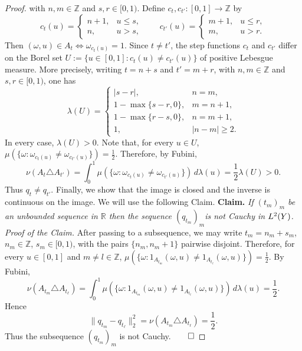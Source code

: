\documentclass[10pt,a4paper]{amsart}
\newcommand{\Z}{\mathbb{Z}}
\begin{document}
\begin{proof}
with \(n,m\in\mathbb Z\) and \(s,r\in[0,1)\). Define $c_t,c_{t'}:[0,1]\to\Z$ by
\[
        c_t(u)=
        \begin{cases}
        n+1, & u\leq s,\\
        n, & u>s,
        \end{cases}
        \qquad
        c_{t'}(u)=
        \begin{cases}
        m+1, & u\leq r,\\
        m, & u>r.
        \end{cases}
\]
Then $(\omega,u)\in A_t\Leftrightarrow\omega_{c_t(u)}=1$. Since \(t\neq t'\), the step functions \(c_t\) and \(c_{t'}\) differ on the Borel set $U:=\{u\in[0,1]:c_t(u)\neq c_{t'}(u)\}$
of positive Lebesgue measure. More precisely, writing
$t=n+s$ and $t'=m+r$, with $n,m\in\mathbb Z$ and $s,r\in[0,1)$, one has
$$
\lambda(U)=
\begin{cases}
|s-r|, & n=m,\\
1-\max\{s-r,0\}, & m=n+1,\\
1-\max\{r-s,0\}, & n=m+1,\\
1, & |n-m|\geq 2.
\end{cases}
$$
In every case, $\lambda(U)>0$. Note that, for every \(u\in U\), $ \mu(\{\omega:\omega_{c_t(u)}\neq\omega_{c_{t'}(u)}\})
        =
        \frac12$. Therefore, by Fubini,
\[
        \nu(A_t\triangle A_{t'})
        =
        \int_0^1
        \mu(\{\omega:\omega_{c_t(u)}\neq\omega_{c_{t'}(u)}\})\,d\lambda(u)
       =
        \frac12\lambda(U)>0.
\]
Thus \(q_t\neq q_{t'}\).
\medskip
\noindent Finally, we show that the image is closed and the inverse is continuous on the image. We will use the following Claim.
\medskip
\noindent\textbf{Claim.} \textit{If \((t_m)_m\) be an unbounded sequence in \(\mathbb R\) then the sequence $(q_{t_m})_m$is not Cauchy in \({\rm L}^2(Y)\).}
\medskip
\noindent\textit{Proof of the Claim.} After passing to a subsequence, we may write $t_m=n_m+s_m$, $n_m\in\mathbb Z$, $s_m\in[0,1)$, with the pairs $\{n_m,n_m+1\}$ pairwise disjoint. Therefore, for every \(u\in[0,1]\) and $m\neq l\in\Z$, $\mu(\{\omega:1_{A_{t_m}}(\omega,u)\neq 1_{A_{t_\ell}}(\omega,u)\})=\frac12$. By Fubini,
\[
        \nu(A_{t_m}\triangle A_{t_\ell})
        =
        \int_0^1
        \mu(\{\omega:1_{A_{t_m}}(\omega,u)\neq 1_{A_{t_\ell}}(\omega,u)\})
        \,d\lambda(u)
        =
        \frac12.
\]
Hence
\[
        \|q_{t_m}-q_{t_\ell}\|_2^2
        =
        \nu(A_{t_m}\triangle A_{t_\ell})
        =
        \frac12.
\]
Thus the subsequence \((q_{t_m})_m\) is not Cauchy.$\hfill\qed$
\medskip

\end{proof}
\end{document}
